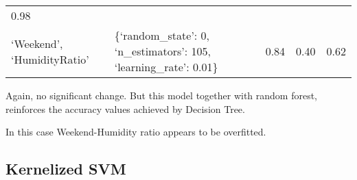 \documentclass[11pt]{article}
\begin{document}
\begin{longtable}[]{@{}lllll@{}}
\begin{minipage}[t]{0.05\columnwidth}
0.98\strut
\end{minipage}\tabularnewline
\begin{minipage}[t]{0.28\columnwidth}\raggedright
`Weekend', `HumidityRatio'\strut
\end{minipage} & \begin{minipage}[t]{0.43\columnwidth}\raggedright
\{`random\_state': 0, `n\_estimators': 105, `learning\_rate':
0.01\}\strut
\end{minipage} & \begin{minipage}[t]{0.05\columnwidth}\raggedright
0.84\strut
\end{minipage} & \begin{minipage}[t]{0.05\columnwidth}\raggedright
0.40\strut
\end{minipage} & \begin{minipage}[t]{0.05\columnwidth}\raggedright
0.62\strut
\end{minipage}\tabularnewline
\bottomrule
\end{longtable}

    Again, no significant change. But this model together with random
forest, reinforces the accuracy values achieved by Decision Tree.

In this case Weekend-Humidity ratio appears to be overfitted.

    \hypertarget{kernelized-svm}{%
\subsection{Kernelized SVM}\label{kernelized-svm}}
\end{document}
